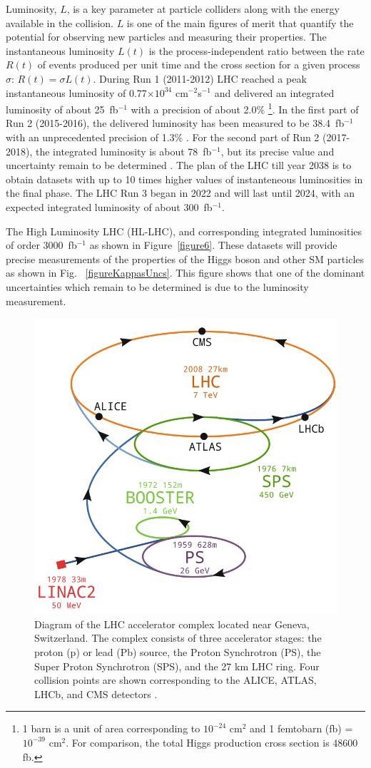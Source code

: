 \documentclass[final,12p]{article}
\newcommand{\lumi}[1]{{#1~fb$^{-1}$}}
\newcommand{\instlumi}[1]{#1$\times 10^{34}$ cm$^{-2}$s$^{-1}$}
\begin{document}
Luminosity, $L$, is a key parameter at particle colliders along with the energy available in the collision.
$L$ is one of the  main figures of merit that quantify the potential for observing new particles and measuring their properties.
The instantaneous luminosity $L(t)$ is the process-independent ratio between the rate $R(t)$ of events produced per unit time and the cross section for a given process $\sigma$:  $R(t) = \sigma L(t)$.
During Run 1 (2011-2012) LHC reached a peak instantaneous luminosity of \instlumi{0.77} and delivered an integrated luminosity of about \lumi{25} with a precision of about 2.0\% 
\footnote{1 barn is a unit of area corresponding to $10^{-24}$ cm${^2}$ and 1 femtobarn (fb) = $10^{-39}$ cm$^{2}$. For comparison, the total Higgs production cross section is 48600 fb.}.
In the first part of Run 2 (2015-2016), the delivered luminosity has been measured to be \lumi{38.4} with an unprecedented precision of 1.3\% \cite{Sirunyan:2021qkt}.
For the second part of Run 2 (2017-2018), the integrated luminosity is about \lumi{78}, but its precise value and uncertainty remain to be determined \cite{CMS:2018elu}.
The plan of the LHC till year 2038 is to obtain datasets with up to 10 times higher values of instanteneous luminosities in the final phase.
The LHC Run 3 began in 2022 and will last until 2024, with an expected integrated luminosity of about \lumi{300}. 

The  High Luminosity LHC (HL-LHC), and corresponding integrated luminosities of order \lumi{3000} as shown in Figure~\ref{figure6}.
These datasets will provide  precise measurements of the properties of the Higgs boson and other SM particles as shown in Fig. ~\ref{figureKappasUncs}.
This figure shows that one of the dominant uncertainties which remain to be determined is due to the luminosity measurement.

 
\begin{figure}[H]
  \centering
  \includegraphics[width=0.6\columnwidth]{./LHCcomplex.png}
  \caption{
    Diagram of the LHC accelerator complex located near Geneva, Switzerland. The complex consists of three accelerator stages: the proton (p) or lead (Pb) source, the Proton Synchrotron (PS), the Super Proton Synchrotron (SPS), and the 27 km LHC ring. Four collision points are shown corresponding to the ALICE, ATLAS, LHCb, and CMS detectors  \cite{Mobs:2684277}.
  }
  \label{figure5}
\end{figure}
\end{document}
